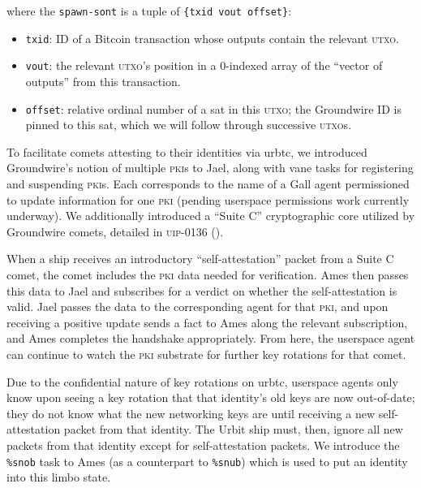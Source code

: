 \documentclass[twoside]{article}
\begin{document}
\noindent
where the \texttt{spawn-sont} is a tuple of \texttt{\{txid\ vout\ offset\}}:

\begin{itemize}[noitemsep,topsep=2pt]

\item
  \texttt{txid}: ID of a Bitcoin transaction whose outputs contain
  the relevant \textsc{utxo}.
\item
  \texttt{vout}: the relevant \textsc{utxo}'s position in a 0-indexed array of
  the ``vector of outputs'' from this transaction.
\item
  \texttt{offset}: relative ordinal number of a sat in this \textsc{utxo}; the
  Groundwire ID is pinned to this sat, which we will follow through
  successive \textsc{utxo}s.
\end{itemize}

To facilitate comets attesting to their identities via urbtc, we
introduced Groundwire's notion of multiple \textsc{pki}s to Jael, along with vane
tasks for registering and suspending \textsc{pki}s. Each corresponds to the name
of a Gall agent permissioned to update information for one \textsc{pki} (pending
userspace permissions work currently underway). We additionally
introduced a ``Suite C'' cryptographic core utilized by Groundwire
comets, detailed in \textsc{uip}-0136 (\citeyear{UIP-0136}).

When a ship receives an introductory ``self-attestation'' packet from a
Suite C comet, the comet includes the \textsc{pki} data needed for verification.
Ames then passes this data to Jael and subscribes for a verdict on
whether the self-attestation is valid. Jael passes the data to the
corresponding agent for that \textsc{pki}, and upon receiving a positive update
sends a fact to Ames along the relevant subscription,
and Ames completes the handshake appropriately. From here, the userspace
agent can continue to watch the \textsc{pki} substrate for further key rotations
for that comet.

Due to the confidential nature of key rotations on urbtc, userspace
agents only know upon seeing a key rotation that that identity's old
keys are now out-of-date; they do not know what the new networking
keys are until receiving a new self-attestation packet from that
identity. The Urbit ship must, then, ignore all new packets from that
identity except for self-attestation packets. We introduce the
\texttt{\%snob} task to Ames (as a counterpart to \texttt{\%snub}) which
is used to put an identity into this limbo state.
\end{document}
